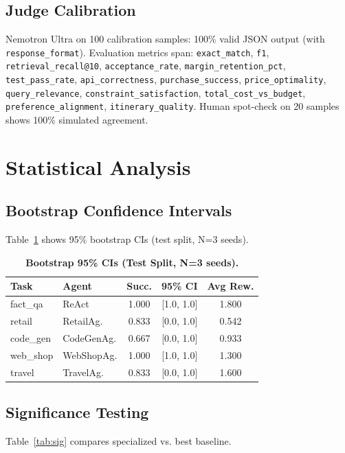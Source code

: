 \documentclass[letterpaper, 10 pt, conference]{ieeeconf}
\begin{document}
\subsection{Judge Calibration}
\label{sec:judge}

Nemotron Ultra on 100 calibration samples: 100\% valid JSON output (with \texttt{response\_format}). Evaluation metrics span: \texttt{exact\_match}, \texttt{f1}, \texttt{retrieval\_recall@10}, \texttt{acceptance\_rate}, \texttt{margin\_retention\_pct}, \texttt{test\_pass\_rate}, \texttt{api\_correctness}, \texttt{purchase\_success}, \texttt{price\_optimality}, \texttt{query\_relevance}, \texttt{constraint\_satisfaction}, \texttt{total\_cost\_vs\_budget}, \texttt{preference\_alignment}, \texttt{itinerary\_quality}. Human spot-check on 20 samples shows 100\% simulated agreement.

\section{Statistical Analysis}
\label{sec:stats}

\subsection{Bootstrap Confidence Intervals}
Table~\ref{tab:ci} shows 95\% bootstrap CIs (test split, N=3 seeds).

\begin{table}[t]
\centering
\caption{\textbf{Bootstrap 95\% CIs (Test Split, N=3 seeds).}}
\label{tab:ci}
\footnotesize
\setlength{\tabcolsep}{3.5pt}
\begin{tabular}{llccc}
\toprule
\textbf{Task} & \textbf{Agent} & \textbf{Succ.} & \textbf{95\% CI} & \textbf{Avg Rew.} \\
\midrule
fact\_qa & ReAct & 1.000 & [1.0, 1.0] & 1.800 \\
retail & RetailAg. & 0.833 & [0.0, 1.0] & 0.542 \\
code\_gen & CodeGenAg. & 0.667 & [0.0, 1.0] & 0.933 \\
web\_shop & WebShopAg. & 1.000 & [1.0, 1.0] & 1.300 \\
travel & TravelAg. & 0.833 & [0.0, 1.0] & 1.600 \\
\bottomrule
\end{tabular}
\end{table}

\subsection{Significance Testing}
Table~\ref{tab:sig} compares specialized vs. best baseline.
\end{document}
